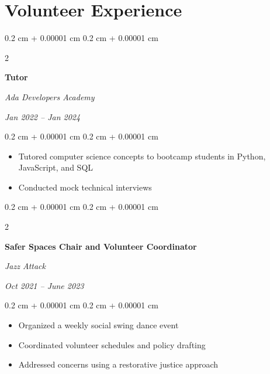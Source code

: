 \documentclass[10pt, letterpaper]{article}
\newenvironment{highlights}{
    \begin{itemize}[
        topsep=0.10 cm,
        parsep=0.10 cm,
        partopsep=0pt,
        itemsep=0pt,
        leftmargin=0.4 cm + 10pt
    ]
}{
    \end{itemize}
} %
\newenvironment{onecolentry}{
    \begin{adjustwidth}{
        0.2 cm + 0.00001 cm
    }{
        0.2 cm + 0.00001 cm
    }
}{
    \end{adjustwidth}
} %
\newenvironment{twocolentry}[2][]{
    \onecolentry
    \def\secondColumn{#2}
    \setcolumnwidth{\fill, 4.5 cm}
    \begin{paracol}{2}
}{
    \switchcolumn \raggedleft \secondColumn
    \end{paracol}
    \endonecolentry
} %
\begin{document}
    
    \section{Volunteer Experience}



        
        \begin{twocolentry}{
            
            
        \textit{Jan 2022 – Jan 2024}}
            \textbf{Tutor}
            
            \textit{Ada Developers Academy}
        \end{twocolentry}

        \vspace{0.10 cm}
        \begin{onecolentry}
            \begin{highlights}
                \item Tutored computer science concepts to bootcamp students in Python, JavaScript, and SQL
                \item Conducted mock technical interviews
            \end{highlights}
        \end{onecolentry}


        \vspace{0.2 cm}

        \begin{twocolentry}{
            
            
        \textit{Oct 2021 – June 2023}}
            \textbf{Safer Spaces Chair and Volunteer Coordinator}
            
            \textit{Jazz Attack}
        \end{twocolentry}

        \vspace{0.10 cm}
        \begin{onecolentry}
            \begin{highlights}
                \item Organized a weekly social swing dance event
                \item Coordinated volunteer schedules and policy drafting
                \item Addressed concerns using a restorative justice approach
            \end{highlights}
        \end{onecolentry}
\end{document}

